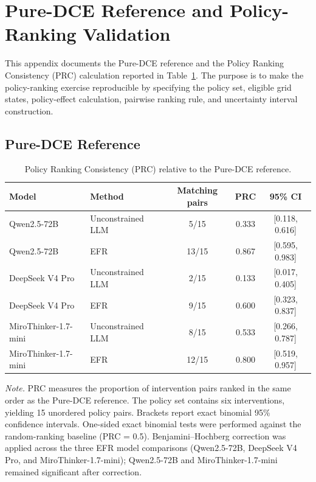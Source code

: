 \documentclass[11pt]{article}
\begin{document}
\section{Pure-DCE Reference and Policy-Ranking Validation}\label{sec:heldout_validation}
\label{app:pure_dce_prc}

This appendix documents the Pure-DCE reference and the Policy Ranking Consistency (PRC) calculation reported in Table~\ref{tab:prc}. The purpose is to make the policy-ranking exercise reproducible by specifying the policy set, eligible grid states, policy-effect calculation, pairwise ranking rule, and uncertainty interval construction.

\subsection{Pure-DCE Reference}

\begin{table}[t]
\centering
\caption{Policy Ranking Consistency (PRC) relative to the Pure-DCE reference.}
\label{tab:prc}
\small
\setlength{\tabcolsep}{5pt}
\begin{tabular}{l l c c c}
\toprule
Model & Method & Matching pairs & PRC & 95\% CI \\
\midrule
Qwen2.5-72B & Unconstrained LLM & 5/15 & 0.333 & [0.118, 0.616] \\
Qwen2.5-72B & EFR & 13/15 & 0.867 & [0.595, 0.983] \\
\midrule
DeepSeek V4 Pro & Unconstrained LLM & 2/15 & 0.133 & [0.017, 0.405] \\
DeepSeek V4 Pro & EFR & 9/15 & 0.600 & [0.323, 0.837] \\
\midrule
MiroThinker-1.7-mini & Unconstrained LLM & 8/15 & 0.533 & [0.266, 0.787] \\
MiroThinker-1.7-mini & EFR & 12/15 & 0.800 & [0.519, 0.957] \\
\bottomrule
\end{tabular}

\vspace{0.4em}
\begin{minipage}{0.95\textwidth}
\small
\textit{Note.} PRC measures the proportion of intervention pairs ranked in the same order as the Pure-DCE reference. The policy set contains six interventions, yielding 15 unordered policy pairs. Brackets report exact binomial 95\% confidence intervals. One-sided exact binomial tests were performed against the random-ranking baseline (PRC = 0.5). Benjamini--Hochberg correction was applied across the three EFR model comparisons (Qwen2.5-72B, DeepSeek V4 Pro, and MiroThinker-1.7-mini); Qwen2.5-72B and MiroThinker-1.7-mini remained significant after correction.
\end{minipage}
\end{table}
\end{document}
